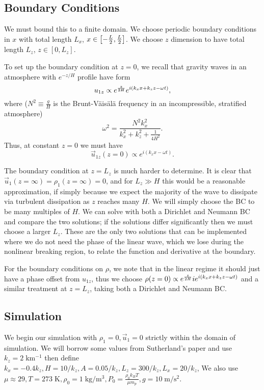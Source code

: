 \documentclass[11pt,
        usenames, %
        dvipsnames %
    ]{report}
\DeclarePairedDelimiter\p{\lparen}{\rparen}
\DeclarePairedDelimiter\s{\lbrack}{\rbrack}
\begin{document}
\subsection{Boundary Conditions}

We must bound this to a finite domain. We choose periodic boundary conditions in
$x$ with total length $L_x$, $x \in \s*{-\frac{L}{2}, \frac{L}{2}}$. We choose
$z$ dimension to have total length $L_z$, $z \in [0, L_z]$.

To set up the boundary condition at $z = 0$, we recall that gravity waves in an
atmosphere with $e^{-z/H}$ profile have form
\begin{equation}
    u_{1z} \propto e^{\frac{z}{2H}}e^{i\p*{k_xx + k_zz - \omega t}},
        \label{eq:bc_below}
\end{equation}
where ($N^2 \equiv \frac{g}{H}$ is the Brunt-V\"ais\"al\"a frequency in an
incompressible, stratified atmosphere)
\begin{equation}
    \omega^2 = \frac{N^2 k_x^2}{k_x^2 + k_z^2 + \frac{1}{4H^2}}.
        \label{eq:omega}
\end{equation}
Thus, at constant $z = 0$ we must have
\begin{equation}
    \vec{u}_{1z}(z = 0) \propto e^{i(k_xx - \omega t)}\label{eq:bc_u1z}.
\end{equation}

The boundary condition at $z = L_z$ is much harder to determine. It is clear
that $\vec{u}_1(z = \infty) = \rho_1(z = \infty) = 0$, and for $L_z \gg H$ this
would be a reasonable approximation, if simply because we expect the majority of
the wave to dissipate via turbulent dissipation as $z$ reaches many $H$. We will
simply choose the BC to be many multiples of $H$. We can solve with both a
Dirichlet and Neumann BC and compare the two solutions; if the solutions
differ significantly then we must choose a larger $L_z$. These are the only two
solutions that can be implemented where we do not need the phase of the linear
wave, which we lose during the nonlinear breaking region, to relate the function
and derivative at the boundary.

For the boundary conditions on $\rho$, we note that in the linear regime it
should just have a phase offset from $u_{1z}$, thus we choose $\rho(z = 0)
\propto e^{\frac{z}{2H}}ie^{i\p*{k_xx + k_zz - \omega t}}$ and a similar
treatment at $z = L_z$, taking both a Dirichlet and Neumann BC\@.

\subsection{Simulation}

We begin our simulation with $\rho_1 = 0, \vec{u}_1 = 0$ strictly within the
domain of simulation. We will borrow some values from Sutherland's paper and use
$k_z = 2\;\mathrm{km^{-1}}$ then define $k_x = -0.4k_z, H = 10 / k_z, A = 0.05 /
k_z, L_z = 300 / k_z, L_x = 20 / k_z$, We also use $\mu \approx 29, T =
273\;\mathrm{K}, \rho_0 = 1\;\mathrm{kg/m^3}, P_0 = \frac{\rho_0 k_BT}{\mu m_p},
g = 10\;\mathrm{m/s^2}$.
\end{document}
